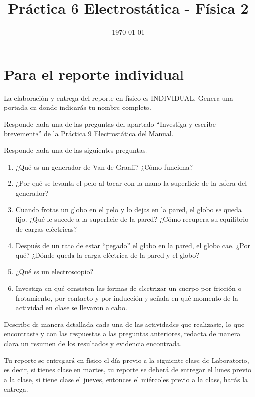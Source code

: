 \documentclass[14pt]{extarticle}
\title{\vspace*{-2cm} Práctica 6 Electrostática - Física 2\vspace{-5ex}}
\date{\today}
\begin{document}
\maketitle

\section{Para el reporte individual}

La elaboración y entrega del reporte en físico es INDIVIDUAL. Genera una portada en donde indicarás tu nombre completo.

Responde cada una de las preguntas del apartado \enquote{Investiga y escribe brevemente} de la Práctica 9 Electrostática del Manual.

Responde cada una de las siguientes preguntas.
\vspace*{0.5cm}
\begin{enumerate}
\item ¿Qué es un generador de Van de Graaff? ¿Cómo funciona?
\item ¿Por qué se levanta el pelo al tocar con la mano la superficie de la esfera del generador?
\item Cuando frotas un globo en el pelo y lo dejas en la pared, el globo se queda fijo. ¿Qué le sucede a la superficie de la pared? ¿Cómo recupera su equilibrio de cargas eléctricas?
\item Después de un rato de estar \enquote{pegado} el globo en la pared, el globo cae. ¿Por qué? ¿Dónde queda la carga eléctrica de la pared y el globo?
\item ¿Qué es un electroscopio?
\item Investiga en qué consisten las formas de electrizar un cuerpo por fricción o frotamiento, por contacto y por inducción y señala en qué momento de la actividad en clase se llevaron a cabo.
\end{enumerate}

Describe de manera detallada cada una de las actividades que realizaste, lo que encontraste y con las respuestas a las preguntas anteriores, redacta de manera clara un resumen de los resultados y evidencia encontrada.

Tu reporte se entregará en físico el día previo a la siguiente clase de Laboratorio, es decir, si tienes clase en martes, tu reporte se deberá de entregar el lunes previo a la clase, si tiene clase el jueves, entonces el miércoles previo a la clase, harás la entrega.
\end{document}
